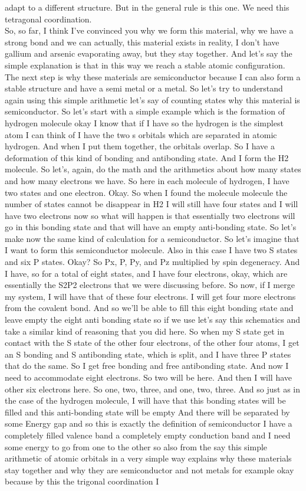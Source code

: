 adapt to a different structure. But in the general rule is this one. We need this tetragonal coordination.\\
So, so far, I think I've convinced you why we form this material, why we have a strong bond and we can actually, this material exists in reality, I don't have gallium and arsenic evaporating away, but they stay together. And let's say the simple explanation is that in this way we reach a stable atomic configuration. The next step is why these materials are semiconductor because I can also form a stable structure and have a semi metal or a metal. So let's try to understand again using this simple arithmetic let's say of counting states why this material is semiconductor. So let's start with a simple example which is the formation of hydrogen molecule okay I know that if I have so the hydrogen is the simplest atom I can think of I have the two s orbitals which are separated in atomic hydrogen. And when I put them together, the orbitals overlap. So I have a deformation of this kind of bonding and antibonding state. And I form the H2 molecule. So let's, again, do the math and the arithmetics about how many states and how many electrons we have. So here in each molecule of hydrogen, I have two states and one electron. Okay. So when I found the molecule molecule the number of states cannot be disappear in H2 I will still have four states and I will have two electrons now so what will happen is that essentially two electrons will go in this bonding state and that will have an empty anti-bonding state. So let's make now the same kind of calculation for a semiconductor. So let's imagine that I want to form this semiconductor molecule. Also in this case I have two S states and six P states. Okay? So Px, P, Py, and Pz multiplied by spin degeneracy. And I have, so for a total of eight states, and I have four electrons, okay, which are essentially the S2P2 electrons that we were discussing before. So now, if I merge my system, I will have that of these four electrons. I will get four more electrons from the covalent bond. And so we'll be able to fill this eight bonding state and leave empty the eight anti bonding state so if we use let's say this schematics and take a similar kind of reasoning that you did here. So when my S state get in contact with the S state of the other four electrons, of the other four atoms, I get an S bonding and S antibonding state, which is split, and I have three P states that do the same. So I get free bonding and free antibonding state. And now I need to accommodate eight electrons. So two will be here. And then I will have other six electrons here. So one, two, three, and one, two, three. And so just as in the case of the hydrogen molecule, I will have that this bonding states will be filled and this anti-bonding state will be empty And there will be separated by some Energy gap and so this is exactly the definition of semiconductor I have a completely filled valence band a completely empty conduction band and I need some energy to go from one to the other so also from the say this simple arithmetic of atomic orbitals in a very simple way explains why these materials stay together and why they are semiconductor and not metals for example okay because by this the trigonal coordination I 